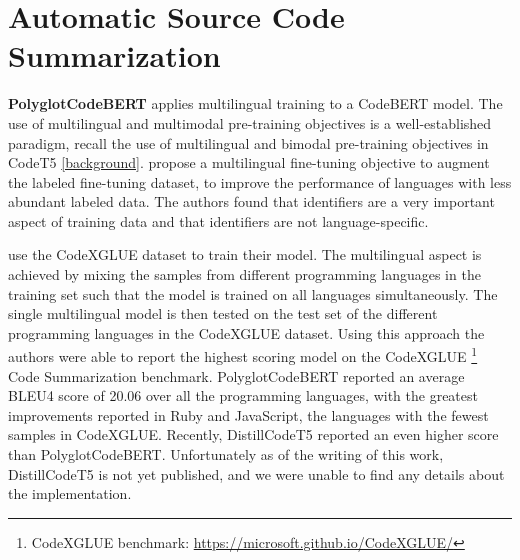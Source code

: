\section{Automatic Source Code Summarization}
\textbf{PolyglotCodeBERT} \cite{PolyglotCodeBERT} applies multilingual training to a CodeBERT \cite{CodeBERT} model. The use of multilingual and multimodal pre-training objectives is a  well-established paradigm, recall the use of multilingual and bimodal pre-training objectives in CodeT5 \cite{CodeT5} \ref{background}. \citeauthor{PolyglotCodeBERT} propose a multilingual fine-tuning objective to augment the labeled fine-tuning dataset, to improve the performance of languages with less abundant labeled data. The authors found that identifiers are a very important aspect of training data and that identifiers are not language-specific. 

\citeauthor{PolyglotCodeBERT} use the CodeXGLUE dataset to train their model. The multilingual aspect is achieved by mixing the samples from different programming languages in the training set such that the model is trained on all languages simultaneously. The single multilingual model is then tested on the test set of the different programming languages in the CodeXGLUE dataset. Using this approach the authors were able to report the highest scoring model on the CodeXGLUE \cite{CodeXGlue} \footnote{CodeXGLUE benchmark: \url{https://microsoft.github.io/CodeXGLUE/}} Code Summarization benchmark. PolyglotCodeBERT reported an average BLEU4 score of 20.06 over all the programming languages, with the greatest improvements reported in Ruby and JavaScript, the languages with the fewest samples in CodeXGLUE. Recently, DistillCodeT5 reported an even higher score than PolyglotCodeBERT. Unfortunately as of the writing of this work, DistillCodeT5 is not yet published, and we were unable to find any details about the implementation.

